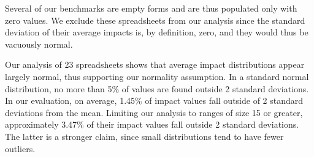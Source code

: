 Several of our benchmarks are empty forms and are thus populated only with zero values.  We exclude these spreadsheets from our analysis since the standard deviation of their average impacts is, by definition, zero, and they would thus be vacuously normal.

Our analysis of 23 spreadsheets shows that average impact distributions appear largely normal, thus supporting our normality assumption.  In a standard normal distribution, no more than 5\% of values are found outside 2 standard deviations.  In our evaluation, on average, 1.45\% of impact values fall outside of 2 standard deviations from the mean.  Limiting our analysis to ranges of size 15 or greater, approximately 3.47\% of their impact values fall outside 2 standard deviations.  The latter is a stronger claim, since small distributions tend to have fewer outliers.
